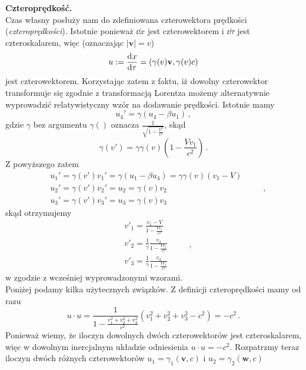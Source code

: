 \documentclass[../main.tex]{subfiles}
\begin{document}
\noindent\textbf{Czteroprędkość.}\\
Czas własny posłuży nam do zdefiniowana czterowektora prędkości (\textit{czteroprędkości}). Istotnie ponieważ \(\dd x\) jest czterowektorem i \(\dd{\tau}\) jest czteroskalarem, więc (oznaczając \(|\mathbf{v}|=v\))
\begin{equation*}
    u:=\dv[]{x}{\tau}=(\gamma(v)\mathbf{v},\gamma(v)c)
\end{equation*}
jest czterowektorem. Korzystając zatem z faktu, iż dowolny czterowektor transformuje się zgodnie z transformacją Lorentza możemy alternatywnie wyprowadzić relatywistyczny wzór na dodawanie prędkości. Istotnie mamy
\begin{equation*}
    u_4'=\gamma(u_4-\beta u_1)\,,
\end{equation*}
gdzie \(\gamma\) bez argumentu \(\gamma()\) oznacza \(\frac{1}{\sqrt{1-\frac{V^2}{c^2}}}\), skąd
\begin{equation*}
    \gamma(v')=\gamma\gamma(v)\left(1-\frac{Vv_1}{c^2}\right)\,.
\end{equation*}
Z powyższego zatem
\begin{equation*}
    \begin{split}
        &u_1'=\gamma(v')v_1'=\gamma(u_1-\beta u_4)=\gamma\gamma(v)(v_1-V)\\
        &u_2'=\gamma(v')v_2'=u_2=\gamma(v)v_2\\
        &u_3'=\gamma(v')v_3'=u_3=\gamma(v)v_3
    \end{split}\quad\quad\,,
\end{equation*}
skąd otrzymujemy
\begin{equation*}
    \begin{split}
        &v'_1=\frac{v_1-V}{1-\frac{Vv_1}{c^2}}\\
        &v'_2=\frac{1}{\gamma}\frac{v_2}{1-\frac{Vv_1}{c^2}}\\
        &v'_3=\frac{1}{\gamma}\frac{v_3}{1-\frac{Vv_1}{c^2}}
    \end{split}\quad\quad\,,
\end{equation*}
w zgodzie z wcześniej wyprowadzonymi wzorami.\\
Poniżej podamy kilka użytecznych związków. Z definicji czteroprędkości mamy od razu
\begin{equation*}
    u\cdot u=\frac{1}{1-\frac{v_1^2+v_2^2+v_3^2}{c^2}}\left(v_1^2+v_2^2+v_3^2-c^2\right)=-c^2\,.
\end{equation*}
Ponieważ wiemy, że iloczyn dowolnych dwóch czterowektorów jest czteroskalarem, więc w dowolnym inercjalnym układzie odniesienia \(u\cdot u=-c^2\). Rozpatrzmy teraz iloczyn dwóch różnych czterowektorów \(u_1=\gamma_1(\mathbf{v},c)\) i \(u_2=\gamma_2(\mathbf{w},c)\)
\end{document}
